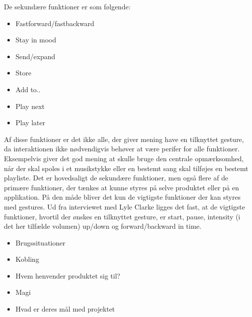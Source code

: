 De sekundære funktioner er som følgende:

\begin{itemize}
	\item Fastforward/fastbackward
	\item Stay in mood
	\item Send/expand
	\item Store
	\item Add to..
	\item Play next
	\item Play later
\end{itemize}

Af disse funktioner er det ikke alle, der giver mening have en tilknyttet gesture, da interaktionen ikke nødvendigvis behøver at være perifer for alle funktioner. Eksempelvis giver det god mening at skulle bruge den centrale opmærksomhed, når der skal spoles i et musikstykke eller en bestemt sang skal tilføjes en bestemt playliste. Det er hovedsaligt de sekundære funktioner, men også flere af de primære funktioner, der tænkes at kunne styres på selve produktet eller på en applikation. På den måde bliver det kun de vigtigste funktioner der kan styres med gestures. Ud fra interviewet med Lyle Clarke ligges det fast, at de vigtigste funktioner, hvortil der ønskes en tilknyttet gesture, er start, pause, intensity (i det her tilfælde volumen) up/down og forward/backward in time. 

\begin{itemize}
  \item Brugssituationer 
  \item Kobling
  \item Hvem henvender produktet sig til?
  \item Magi
  \item Hvad er deres mål med projektet
\end{itemize}

